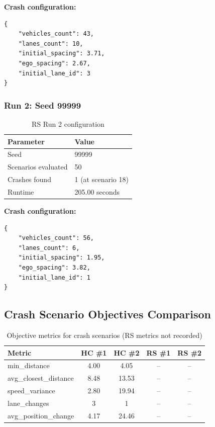 \textbf{Crash configuration:}
\begin{verbatim}
{
    "vehicles_count": 43,
    "lanes_count": 10,
    "initial_spacing": 3.71,
    "ego_spacing": 2.67,
    "initial_lane_id": 3
}
\end{verbatim}

\subsubsection{Run 2: Seed 99999}

\begin{table}[H]
\centering
\begin{tabular}{|l|l|}
\hline
\textbf{Parameter} & \textbf{Value} \\
\hline
Seed & 99999 \\
Scenarios evaluated & 50 \\
Crashes found & 1 (at scenario 18) \\
Runtime & 205.00 seconds \\
\hline
\end{tabular}
\caption{RS Run 2 configuration}
\end{table}

\textbf{Crash configuration:}
\begin{verbatim}
{
    "vehicles_count": 56,
    "lanes_count": 6,
    "initial_spacing": 1.95,
    "ego_spacing": 3.82,
    "initial_lane_id": 1
}
\end{verbatim}

\subsection{Crash Scenario Objectives Comparison}

\begin{table}[H]
\centering
\begin{tabular}{|l|c|c|c|c|}
\hline
\textbf{Metric} & \textbf{HC \#1} & \textbf{HC \#2} & \textbf{RS \#1} & \textbf{RS \#2} \\
\hline
min\_distance & 4.00 & 4.05 & -- & -- \\
avg\_closest\_distance & 8.48 & 13.53 & -- & -- \\
speed\_variance & 2.80 & 19.94 & -- & -- \\
lane\_changes & 3 & 1 & -- & -- \\
avg\_position\_change & 4.17 & 24.46 & -- & -- \\
\hline
\end{tabular}
\caption{Objective metrics for crash scenarios (RS metrics not recorded)}
\end{table}

